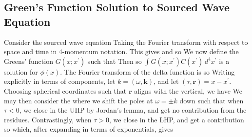 \documentclass{article}
\begin{document}
\subsection{Green's Function Solution to Sourced Wave Equation}
Consider the sourced wave equation 
Taking the Fourier transform with respect to space and time 
in 4-momentum notation. This gives 
and so 
We now define the Greens' function $G(x;x^\prime)$ such that 
Then 
so $\int G(x;x^\prime) C(x^\prime) \, d^4x^\prime$ is a solution for $\phi(x)$. The Fourier transform of the delta function is 
so 
Writing explicitly in terms of components, let $k = (\omega,\bm{k})$, and let $(\tau,\bm{r}) = x-x^\prime$. Choosing spherical coordinates such that $\bm{r}$ aligns with the vertical, we have 
We may then consider the  where we shift the poles at $\omega=\pm k$ down such that when $\tau < 0$, we close in the UHP by Jordan's lemma, and get no contribution from the residues. Contrastingly, when $\tau > 0$, we close in the LHP, and get a contribution 
so 
which, after expanding in terms of exponentials, gives 
\end{document}
